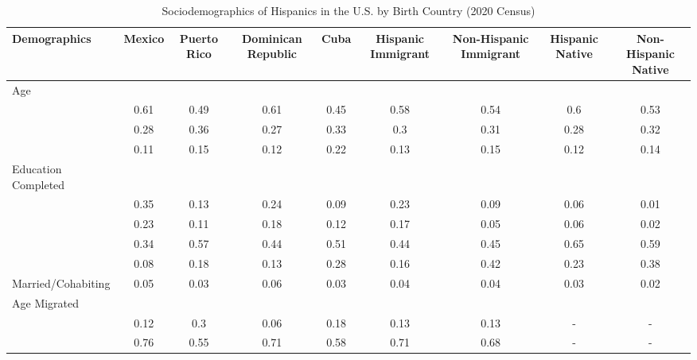 \begin{table}[ht]
\centering
\caption{Sociodemographics of Hispanics in the U.S. by Birth Country (2020 Census)} 
\begingroup\small
\begin{tabular}{>{\raggedright\arraybackslash}p{3.2cm}|cccccccc}
  \hline
Demographics & Mexico & Puerto Rico & Dominican Republic & Cuba & Hispanic Immigrant & Non-Hispanic Immigrant & Hispanic Native & Non-Hispanic Native \\ 
  \hline
Age &  &  &  &  &  &  &  &  \\ 
  \multicolumn{1}{>{\raggedleft\arraybackslash}p{1.5cm}|}{\makebox[1.5cm][r]{60 - 69 }}& 0.61 & 0.49 & 0.61 & 0.45 & 0.58 & 0.54 & 0.6 & 0.53 \\ 
  \multicolumn{1}{>{\raggedleft\arraybackslash}p{1.5cm}|}{\makebox[1.5cm][r]{70 - 79 }}& 0.28 & 0.36 & 0.27 & 0.33 & 0.3 & 0.31 & 0.28 & 0.32 \\ 
  \multicolumn{1}{>{\raggedleft\arraybackslash}p{1.5cm}|}{\makebox[1.5cm][r]{80 - 89 }}& 0.11 & 0.15 & 0.12 & 0.22 & 0.13 & 0.15 & 0.12 & 0.14 \\ 
  Education Completed &  &  &  &  &  &  &  &  \\ 
  \multicolumn{1}{>{\raggedleft\arraybackslash}p{3.2cm}|}{\makebox[3.2cm][r]{Less than Primary }}& 0.35 & 0.13 & 0.24 & 0.09 & 0.23 & 0.09 & 0.06 & 0.01 \\ 
  \multicolumn{1}{>{\raggedleft\arraybackslash}p{1.7cm}|}{\makebox[1.7cm][r]{Primary }}& 0.23 & 0.11 & 0.18 & 0.12 & 0.17 & 0.05 & 0.06 & 0.02 \\ 
  \multicolumn{1}{>{\raggedleft\arraybackslash}p{2cm}|}{\makebox[2cm][r]{Secondary }}& 0.34 & 0.57 & 0.44 & 0.51 & 0.44 & 0.45 & 0.65 & 0.59 \\ 
  \multicolumn{1}{>{\raggedleft\arraybackslash}p{2cm}|}{\makebox[2cm][r]{University }}& 0.08 & 0.18 & 0.13 & 0.28 & 0.16 & 0.42 & 0.23 & 0.38 \\ 
  Married/Cohabiting & 0.05 & 0.03 & 0.06 & 0.03 & 0.04 & 0.04 & 0.03 & 0.02 \\ 
  Age Migrated &  &  &  &  &  &  &  &  \\ 
  \multicolumn{1}{>{\raggedleft\arraybackslash}p{2.4cm}|}{\makebox[2.4cm][r]{Less than 15 }}& 0.12 & 0.3 & 0.06 & 0.18 & 0.13 & 0.13 & - & - \\ 
  \multicolumn{1}{>{\raggedleft\arraybackslash}p{1.6cm}|}{\makebox[1.6cm][r]{15 - 49 }}& 0.76 & 0.55 & 0.71 & 0.58 & 0.71 & 0.68 & - & - \\ 

\end{tabular}
\end{table}
